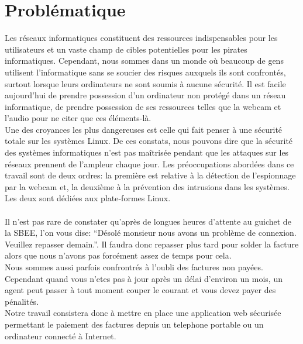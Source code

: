     \section{Problématique}
    \small{
	Les réseaux informatiques constituent des ressources indispensables pour les utilisateurs et un vaste champ de cibles potentielles pour les pirates informatiques. Cependant, nous sommes dans un monde où beaucoup de gens utilisent l'informatique sans se soucier des risques auxquels ils sont confrontés, surtout lorsque leurs ordinateurs ne sont soumis à aucune sécurité. Il est facile aujourd'hui de prendre possession d'un ordinateur non protégé dans un réseau informatique, de prendre possession de ses ressources telles que la webcam et l'audio pour ne citer que ces éléments-là.\\ Une des croyances les plus dangereuses est celle qui fait penser à une sécurité totale sur les systèmes Linux. De ces constats, nous pouvons dire que la sécurité des systèmes informatiques n'est pas maîtrisée pendant que les attaques sur les réseaux prennent de l'ampleur chaque jour. Les préoccupations abordées dans ce travail sont de deux ordres:  la première est relative à la détection de l'espionnage par la webcam et, la deuxième à la prévention des intrusions dans les systèmes. Les deux sont dédiées aux plate-formes Linux.  
	 \\ \\
	Il n'est pas rare de constater qu'apr\`es de longues heures d'attente au guichet de la SBEE, l'on vous dise: ``D\'esol\'e monsieur nous avons un probl\`eme de connexion. Veuillez repasser demain.''. Il faudra donc repasser plus tard pour solder la facture alors que nous n'avons pas forc\'ement assez de temps pour cela. \\
	Nous sommes aussi parfois confrontr\'es \`a l'oubli des factures non pay\'ees. Cependant quand vous n'etes pas \`a jour apr\`es un d\'elai d'environ un mois, un agent peut passer \`a tout moment couper le courant et vous devez payer des p\'enalit\'es.\\
	Notre travail consistera donc \`a mettre en place une application web s\'ecuris\'ee permettant le paiement des factures depuis un telephone portable ou un ordinateur connect\'e \`a Internet.}

